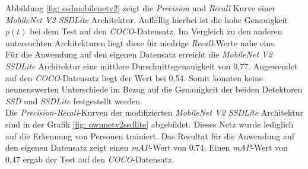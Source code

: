 

Abbildung \ref{fig: ssdmobilenetv2} zeigt die \textit{Precision} und \textit{Recall} Kurve einer \textit{MobileNet V2 SSDLite} Architektur. Auffällig hierbei ist die hohe Genauigkeit $p(t)$ bei dem Test auf den \textit{COCO}-Datensatz. Im Vergleich zu den anderen untersuchten Architekturen liegt diese für niedrige \textit{Recall}-Werte nahe eins.\\

 Für die Anwendung auf den eigenen Datensatz erreicht die \textit{MobileNet V2 SSDLite} Architektur eine mittlere Durschnittsgenauigkeit von 0,77. Angewendet auf den \textit{COCO}-Datensatz liegt der Wert bei 0,54. Somit konnten  keine nennenswerten Unterschiede im Bezug auf die Genauigkeit der beiden Detektoren \textit{SSD} und \textit{SSDLite} festgestellt werden. \\
 
 Die \textit{Precision-Recall}-Kurven der modifizierten \textit{MobileNet V2 SSDLite} Architektur sind in der Grafik \ref{fig: ownnetv2ssdlite} abgebildet. Dieses Netz wurde lediglich auf die Erkennung von Personen trainiert. Das Resultat für die Anwendung auf den eigenen Datensatz zeigt einen \textit{mAP}-Wert von 0,74. Einen \textit{mAP}-Wert von 0,47 ergab der Test auf den \textit{COCO}-Datensatz.\\ 

 

 
  


